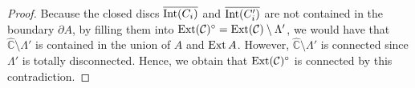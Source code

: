 \documentclass[10pt,a4paper]{amsart}
\DeclareMathOperator{\Ext}{\rm Ext}
\DeclareMathOperator{\Int}{\rm Int}
\begin{document}
\begin{proof}
Because the closed discs 
$\overline{\Int(C_i)}$ and $\overline{\Int(C'_i)}$ are not contained in
the boundary $\partial A$, by filling them into $\Ext (\mathcal{C})^{\circ}=\Ext (\mathcal{C}) \setminus \Lambda'$,
 we would have that $\widehat{\mathbb C} \setminus \Lambda'$ is contained 
 in the union of $A$ and $\Ext A$.
 However, $\widehat{\mathbb C} \setminus \Lambda'$ is connected since $\Lambda'$ is totally disconnected.
 Hence, we obtain that $\Ext (\mathcal{C})^{\circ}$ is connected by this contradiction.
 \end{proof}
\end{document}
